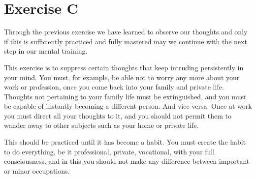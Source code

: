 \section{Exercise C}

Through the previous exercise we have learned to observe our thoughts and only if this is
sufficiently practiced and fully mastered may we continue with the next step in our mental
training.

This exercise is to suppress certain thoughts that keep intruding persistently in your mind.
You must, for example, be able not to worry any more about your work or profession, once you
come back into your family and private life. Thoughts not pertaining to your family life must be
extinguished, and you must be capable of instantly becoming a different person. And vice versa.
Once at work you must direct all your thoughts to it, and you should not permit them to wander
away to other subjects such as your home or private life.

This should be practiced until it has become a habit. You must create the habit to do everything,
be it professional, private, vocational, with your full consciousness, and in this you should not
make any difference between important or minor occupations. 